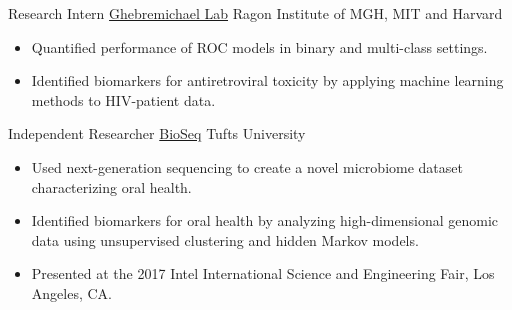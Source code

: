 \cventry
{\dates[05.2018-12.2019]}
{Research Intern}
{\href{http://www.ragoninstitute.org/portfolio-item/ghebremichael/}{Ghebremichael Lab}}
{Ragon Institute of MGH, MIT and Harvard}
{}
{
\begin{itemize}
    \item Quantified performance of ROC models in binary and multi-class settings.
    \item Identified biomarkers for antiretroviral toxicity by applying machine learning methods to HIV-patient data.
\end{itemize}{}
}

\cventry
{\dates[06.2017-06.2017]}
{Independent Researcher}
{\href{http://ase.tufts.edu/chemistry/walt/sepa/index.html}{BioSeq}}
{Tufts University}
{}
{
\begin{itemize}
    \item Used next-generation sequencing to create a novel microbiome dataset characterizing oral health.
    \item Identified biomarkers for oral health by analyzing high-dimensional genomic data using unsupervised clustering and hidden Markov models.
    \item Presented at the 2017 Intel International Science and Engineering Fair, Los Angeles, CA.
\end{itemize}{}
}